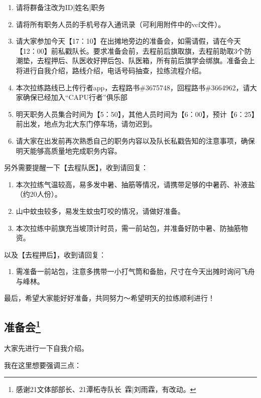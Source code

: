 \documentclass[UTF8]{ctexart}
\begin{document}
\begin{enumerate}[nosep,left=4em]
    \item 请将群备注改为ID|姓名|职务
    \item 请将所有职务人员的手机号存入通讯录（可利用附件中的vcf文件）。
    \item 请大家参加今天【17：10】在出摊地旁边的准备会，如需请假，请在今天【12：00】前私戳队长。要求准备会前，去程前后旗取旗，去程前助取3个防潮垫，去程押后、队医收好押后包、队医箱，所有前后旗学会绑旗。准备会上将进行自我介绍，路线介绍，电话号码抽查，拉练流程介绍。
    \item 本次拉练路线已上传行者app，去程路书\#3675748，回程路书\#3664962，请大家确保已经加入“CAPU行者”俱乐部
    \item 明天职务人员集合时间为【5：50】，其他人员时间为【6：00】，预计【6：25】前出发，地点为北大东门停车场，请勿迟到。
    \item 请大家在出发前再次熟悉自己的职务内容以及队长私戳告知的注意事项，确保明天能够高质量地完成职务内容。
\end{enumerate}

另外需要提醒一下【去程队医】，收到请回复：
\begin{enumerate}[nosep,left=4em]
    \item 本次拉练气温较高，易多发中暑、抽筋等情况，请携带足够的中暑药、补液盐（约20人份）。
    \item 山中蚊虫较多，易发生蚊虫叮咬的情况，请做好准备。
    \item 本次拉练中前旗充当坡顶计时员，需一前站包，并准备好防中暑、防抽筋物资。
\end{enumerate}

以及【去程押后】，收到请回复：
\begin{enumerate}[nosep,left=4em]
    \item 需准备一前站包，注意多携带一小打气筒和备胎，尺寸在今天出摊时询问飞舟与峰林。
\end{enumerate}

最后，希望大家能好好准备，共同努力～希望明天的拉练顺利进行！

\subsection[准备会]{准备会\protect\footnote{感谢21文体部部长、21潭柘寺队长\ 霖|刘雨霖，有改动。}}

大家先进行一下自我介绍。

我在这里想要强调三点：
\end{document}
